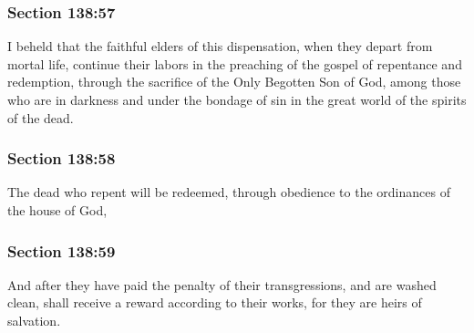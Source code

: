 	\subsubsection{Section 138:57} %
		\label{DC138-57}

		I beheld that the faithful elders of this dispensation, when they depart from mortal life, continue their labors in the preaching of the gospel of repentance and redemption, through the sacrifice of the Only Begotten Son of God, among those who are in darkness and under the bondage of sin in the great world of the spirits of the dead.


	\subsubsection{Section 138:58} %
		\label{DC138-58}

		The dead who repent will be redeemed, through obedience to the ordinances of the house of God,


	\subsubsection{Section 138:59} %
		\label{DC138-59}

		And after they have paid the penalty of their transgressions, and are washed clean, shall receive a reward according to their works, for they are heirs of salvation.


